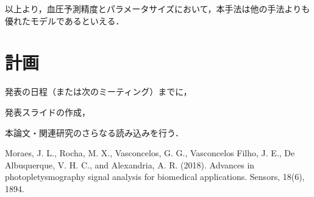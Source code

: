 \documentclass[dvipdfmx]{jsarticle}
\begin{document}
以上より，血圧予測精度とパラメータサイズにおいて，本手法は他の手法よりも優れたモデルであるといえる．

\section{計画}
発表の日程（または次のミーティング）までに，

発表スライドの作成，

本論文・関連研究のさらなる読み込みを行う．

\begin{thebibliography}{}
     Moraes, J. L., Rocha, M. X., Vasconcelos, G. G., Vasconcelos Filho, J. E., De Albuquerque, V. H. C., and Alexandria, A. R. (2018). Advances in photopletysmography signal analysis for biomedical applications. Sensors, 18(6), 1894.
\end{thebibliography}
\end{document}
